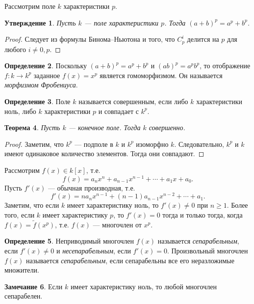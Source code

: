 \documentclass[12pt, titlepage, oneside]{amsbook}
\newtheorem{theorem}{Теорема}[chapter]
\newtheorem{claim}[theorem]{Утверждение}
\theoremstyle{definition}
\newtheorem{definition}[theorem]{Определение}
\newtheorem{remark}[theorem]{Замечание}
\theoremstyle{remark}
\begin{document}
Рассмотрим поле $k$ характеристики $p$.

 \begin{claim}
\label{Har1}
Пусть $k$ --- поле характеристики $p$. Тогда $(a+b)^p=a^p+b^p$.
\end{claim}

\begin{proof}
Следует из формулы Бинома--Ньютона и того, что $C_p^i$ делится на $p$ для любого $i\neq 0,p$.
\end{proof}

\begin{definition}
Поскольку $(a+b)^p=a^p+b^p$ и $(ab)^p=a^p b^p$, то отображение $f\colon k\rightarrow k^p$ заданное $f(x)=x^p$ является гомоморфизмом. Он называется \emph{морфизмом Фробениуса}.
\end{definition}

\begin{definition}
Поле $k$ называется совершенным, если либо $k$ характеристики ноль, либо $k$ характеристики $p$ и совпадает с $k^p$.
\end{definition}

\begin{theorem}
\label{Sov}
Пусть $k$ --- конечное поле. Тогда $k$ совершенно.
\end{theorem}

\begin{proof}
Заметим, что $k^p$ --- подполе в $k$ и $k^p$ изоморфно $k$. Следовательно, $k^p$ и $k$ имеют одинаковое количество элементов. Тогда они совпадают.
\end{proof}

Рассмотрим $f(x)\in k[x]$, т.е. $$f(x)=a_n x^n+a_{n-1} x^{n-1}+\cdots+a_1x+a_0.$$ Пусть $f'(x)$ --- обычная производная, т.е. $$f'(x)=na_n x^{n-1}+(n-1)a_{n-1} x^{n-2}+\cdots+a_1.$$ Заметим, что если $k$ имеет характеристику ноль, то $f'(x)\neq 0$ при $n\geq 1$. Более того, если $k$ имеет характеристику $p$, то $f'(x)= 0$ тогда и только тогда, когда $f(x)=\tilde{f}(x^p)$, т.е. $f(x)$ --- многочлен от $x^p$.

\begin{definition}
Неприводимый многочлен $f(x)$ называется \emph{сепарабельным}, если $f'(x)\neq 0$ и \emph{несепарабельным}, если $f'(x)=0$. Произвольный многочлен $f(x)$ называется \emph{сепарабельным}, если сепарабельны все его неразложимые множители.
\end{definition}

\begin{remark}
Если $k$ имеет характеристику ноль, то любой многочлен сепарабелен.
\end{remark}
\end{document}
